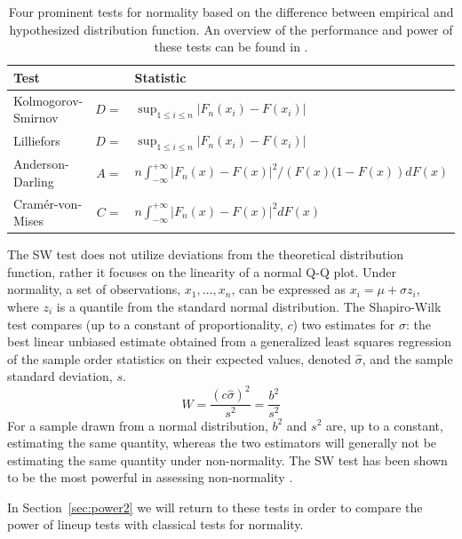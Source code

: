 \documentclass[12pt]{article}\usepackage[]{graphicx}\usepackage[]{color}
\newcommand{\al}[1]{{\color{ForestGreen} #1}}
\begin{document}
\begin{table}
\centering
\caption{\label{tab:tests} Four prominent tests for normality based on the difference between empirical and hypothesized distribution function. An overview of the performance and power of these tests can be found in \citet{stephens:1974}.}
\begin{tabular}{lrl}\hline
Test && Statistic\\\hline\hline
Kolmogorov-Smirnov & $D =$ & $ \sup_{1 \le i \le n} \left | F_n(x_i) - F(x_i)\right|$ \\
Lilliefors & $D =$ & $ \sup_{1 \le i \le n} \left | F_n(x_i) - F(x_i)\right|$ \\
Anderson-Darling & $A =$ & $ n \int_{-\infty}^{+\infty} \left | F_n(x) - F(x)\right|^2/\left(F(x)(1 - F(x)\right) dF(x)$\\
Cram\'{e}r-von-Mises & $C =$ & $n \int_{-\infty}^{+\infty} \left | F_n(x) - F(x)\right|^2 dF(x)$ \\\hline
\end{tabular}
\end{table}
\afterpage{\clearpage}

%

The SW test \cite[SW-test,][]{Shapiro:1965kt} does not utilize deviations from the theoretical distribution function, rather it focuses on the linearity of a normal Q-Q plot. Under normality, a set of observations, $x_1, \ldots, x_n$, can be expressed as $x_i = \mu + \sigma z_i$, where $z_i$ is a quantile from the standard normal distribution. The Shapiro-Wilk test compares (up to a constant of proportionality, $c$) two estimates for $\sigma$: the best linear unbiased estimate obtained from a generalized least squares regression of the sample order statistics on their expected values, denoted $\widehat{\sigma}$, and the sample standard deviation, $s$.
\[
  W = \frac{(c \widehat{\sigma})^2}{s^2} = \frac{b^2}{s^2}
\]
For a sample drawn from a normal distribution, $b^2$ and $s^2$ are, up to a constant, estimating the same quantity, whereas the two estimators will generally not be estimating the same quantity under non-normality. The SW test has been shown to be the most powerful in assessing non-normality \citep{stephens:1974, razali:2011}.

In Section~\ref{sec:power2} we will return to these tests in order to \al{compare the power of lineup tests with classical tests for normality.}
\end{document}
